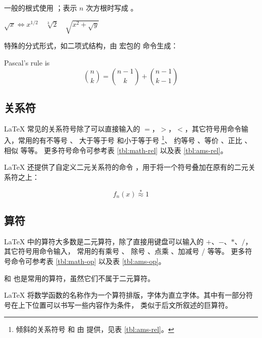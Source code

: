 一般的根式使用 ；表示 $n$ 次方根时写成 。
\begin{example}
$\sqrt{x} \Leftrightarrow x^{1/2}
\quad \sqrt[3]{2}
\quad \sqrt{x^{2} + \sqrt{y}}$
\end{example}

特殊的分式形式，如二项式结构，由  宏包的  命令生成：
\begin{example}
Pascal's rule is
\[
\binom{n}{k} =\binom{n-1}{k}
+ \binom{n-1}{k-1}
\]
\end{example}

\subsection{关系符}\label{subsec:math-rel}

\LaTeX{} 常见的关系符号除了可以直接输入的 $=$，$>$，$<$，其它符号用命令输入，常用的有不等号 、
大于等于号  和小于等于号 %
\footnote{倾斜的关系符号  和  由  提供，见表 \ref{tbl:ams-rel}。}、
约等号 、等价 、正比 、相似  等等。
更多符号命令可参考表 \ref{tbl:math-rel} 以及表 \ref{tbl:ams-rel}。

\LaTeX{} 还提供了自定义二元关系符的命令 ，用于将一个符号叠加在原有的二元关系符之上：
\begin{example}
\[
f_n(x) \stackrel{*}{\approx} 1
\]
\end{example}

\subsection{算符}\label{subsec:math-op}

\LaTeX{} 中的算符大多数是二元算符，除了直接用键盘可以输入的 $+$、$-$、$*$、$/$，其它符号用命令输入，
常用的有乘号 、 除号 、点乘 、加减号  /  等等。
更多符号命令可参考表 \ref{tbl:math-op} 以及表 \ref{tbl:ams-op}。

 和  也是常用的算符，虽然它们不属于二元算符。

\LaTeX{} 将数学函数的名称作为一个算符排版，字体为直立字体。其中有一部分符号在上下位置可以书写一些内容作为条件，
类似于后文所叙述的巨算符。

